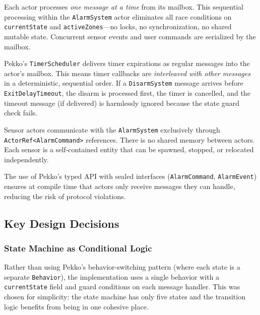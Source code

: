\documentclass[a4paper, 12pt]{article}
\begin{document}
\begin{description}[style=nextline]
  \item[Single-threaded message processing (mailbox)]
    Each actor processes \emph{one message at a time} from its mailbox. This sequential processing within the \texttt{AlarmSystem} actor eliminates all race conditions on \texttt{currentState} and \texttt{activeZones}---no locks, no synchronization, no shared mutable state. Concurrent sensor events and user commands are serialized by the mailbox.

  \item[Timer integration via \texttt{TimerScheduler}]
    Pekko's \texttt{TimerScheduler} delivers timer expirations as regular messages into the actor's mailbox. This means timer callbacks are \emph{interleaved with other messages} in a deterministic, sequential order. If a \texttt{DisarmSystem} message arrives before \texttt{ExitDelayTimeout}, the disarm is processed first, the timer is cancelled, and the timeout message (if delivered) is harmlessly ignored because the state guard check fails.

  \item[Location transparency and isolation]
    Sensor actors communicate with the \texttt{AlarmSystem} exclusively through \texttt{ActorRef<AlarmCommand>} references. There is no shared memory between actors. Each sensor is a self-contained entity that can be spawned, stopped, or relocated independently.

  \item[Typed protocols]
    The use of Pekko's typed API with sealed interfaces (\texttt{AlarmCommand}, \texttt{AlarmEvent}) ensures at compile time that actors only receive messages they can handle, reducing the risk of protocol violations.
\end{description}

\subsection{Key Design Decisions}

\subsubsection{State Machine as Conditional Logic}

Rather than using Pekko's behavior-switching pattern (where each state is a separate \texttt{Behavior}), the implementation uses a single behavior with a \texttt{currentState} field and guard conditions on each message handler. This was chosen for simplicity: the state machine has only five states and the transition logic benefits from being in one cohesive place.
\end{document}
